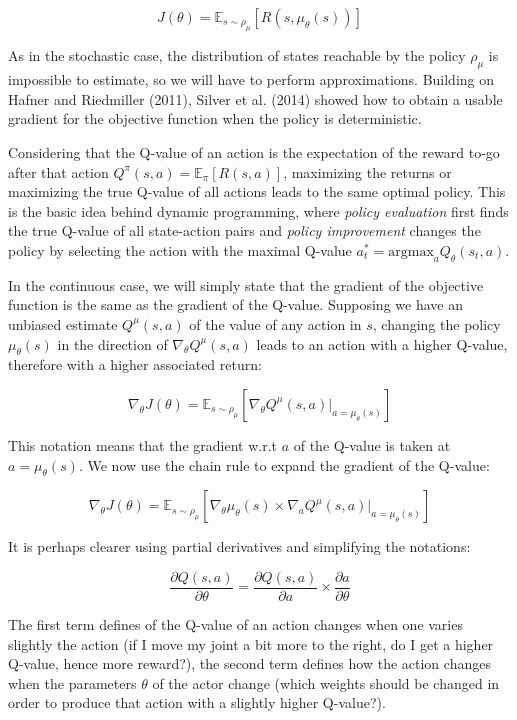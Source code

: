 \documentclass[
  letterpaper,
  DIV=11,
  numbers=noendperiod]{scrreprt}
\begin{document}
\[
    J(\theta) =  \mathbb{E}_{s \sim \rho_\mu}[R(s, \mu_\theta(s))]
\]

As in the stochastic case, the distribution of states reachable by the
policy \(\rho_\mu\) is impossible to estimate, so we will have to
perform approximations. Building on Hafner and Riedmiller (2011), Silver
et al. (2014) showed how to obtain a usable gradient for the objective
function when the policy is deterministic.

Considering that the Q-value of an action is the expectation of the
reward to-go after that action
\(Q^\pi(s, a) = \mathbb{E}_\pi[R(s, a)]\), maximizing the returns or
maximizing the true Q-value of all actions leads to the same optimal
policy. This is the basic idea behind dynamic programming, where
\emph{policy evaluation} first finds the true Q-value of all
state-action pairs and \emph{policy improvement} changes the policy by
selecting the action with the maximal Q-value
\(a^*_t = \text{argmax}_a Q_\theta(s_t, a)\).

In the continuous case, we will simply state that the gradient of the
objective function is the same as the gradient of the Q-value. Supposing
we have an unbiased estimate \(Q^\mu(s, a)\) of the value of any action
in \(s\), changing the policy \(\mu_\theta(s)\) in the direction of
\(\nabla_\theta Q^\mu(s, a)\) leads to an action with a higher Q-value,
therefore with a higher associated return:

\[
    \nabla_\theta J(\theta) = \mathbb{E}_{s \sim \rho_\mu}[\nabla_\theta Q^\mu(s, a) |_{a = \mu_\theta(s)}]
\]

This notation means that the gradient w.r.t \(a\) of the Q-value is
taken at \(a = \mu_\theta(s)\). We now use the chain rule to expand the
gradient of the Q-value:

\[
    \nabla_\theta J(\theta) = \mathbb{E}_{s \sim \rho_\mu}[\nabla_\theta \mu_\theta(s) \times \nabla_a Q^\mu(s, a) |_{a = \mu_\theta(s)}]
\]

It is perhaps clearer using partial derivatives and simplifying the
notations:

\[
    \frac{\partial Q(s,a)}{\partial \theta} = \frac{\partial Q(s,a)}{\partial a} \times \frac{\partial a}{\partial \theta}
\]

The first term defines of the Q-value of an action changes when one
varies slightly the action (if I move my joint a bit more to the right,
do I get a higher Q-value, hence more reward?), the second term defines
how the action changes when the parameters \(\theta\) of the actor
change (which weights should be changed in order to produce that action
with a slightly higher Q-value?).
\end{document}
